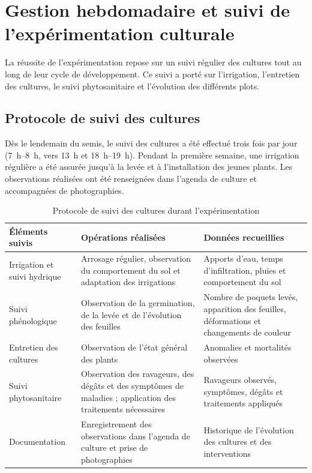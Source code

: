 \section{Gestion hebdomadaire et suivi de l'expérimentation culturale}
La réussite de l’expérimentation repose sur un suivi régulier des cultures tout au long de leur cycle de développement. Ce suivi a porté sur l’irrigation, l’entretien des cultures, le suivi phytosanitaire et l’évolution des différents plots.

\subsection{Protocole de suivi des cultures}
Dès le lendemain du semis, le suivi des cultures a été effectué trois fois par jour (7~h–8~h, vers 13~h et 18~h–19~h). Pendant la première semaine, une irrigation régulière a été assurée jusqu’à la levée et à l’installation des jeunes plants. Les observations réalisées ont été renseignées dans l’agenda de culture et accompagnées de photographies.

\begin{table}[H]
    \centering
    \small
    \caption{Protocole de suivi des cultures durant l'expérimentation}
    \label{tab:protocole_suivi}
    \begin{tabular}{|p{3.2cm}|p{5.4cm}|p{5.4cm}|}
        \hline
        \textbf{Éléments suivis} & \textbf{Opérations réalisées} & \textbf{Données recueillies} \\
        \hline
        Irrigation et suivi hydrique & Arrosage régulier, observation du comportement du sol et adaptation des irrigations & Apports d'eau, temps d'infiltration, pluies et comportement du sol \\
        \hline
        Suivi phénologique & Observation de la germination, de la levée et de l'évolution des feuilles & Nombre de poquets levés, apparition des feuilles, déformations et changements de couleur \\
        \hline
        Entretien des cultures & Observation de l'état général des plants & Anomalies et mortalités observées \\
        \hline
        Suivi phytosanitaire & Observation des ravageurs, des dégâts et des symptômes de maladies ; application des traitements nécessaires & Ravageurs observés, symptômes, dégâts et traitements appliqués \\
        \hline
        Documentation & Enregistrement des observations dans l'agenda de culture et prise de photographies & Historique de l'évolution des cultures et des interventions \\
        \hline
    \end{tabular}
\end{table}

